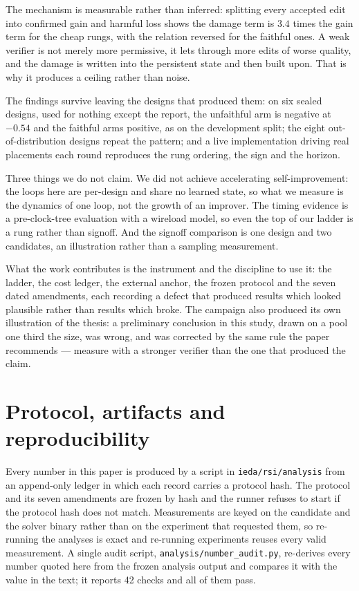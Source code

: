 \documentclass{article}
\begin{document}
The mechanism is measurable rather than inferred: splitting every accepted edit into
confirmed gain and harmful loss shows the damage term is $3.4$ times the gain term for
the cheap rungs, with the relation reversed for the faithful ones. A weak verifier is not
merely more permissive, it lets through more edits of worse quality, and the damage is
written into the persistent state and then built upon. That is why it produces a ceiling
rather than noise.

The findings survive leaving the designs that produced them: on six sealed designs, used
for nothing except the report, the unfaithful arm is negative at $-0.54$ and the faithful
arms positive, as on the development split; the eight out-of-distribution designs repeat
the pattern; and a live implementation driving real placements each round reproduces the
rung ordering, the sign and the horizon.

Three things we do not claim. We did not achieve accelerating self-improvement: the
loops here are per-design and share no learned state, so what we measure is the dynamics
of one loop, not the growth of an improver. The timing evidence is a pre-clock-tree
evaluation with a wireload model, so even the top of our ladder is a rung rather than
signoff. And the signoff comparison is one design and two candidates, an illustration
rather than a sampling measurement.

What the work contributes is the instrument and the discipline to use it: the ladder,
the cost ledger, the external anchor, the frozen protocol and the seven dated
amendments, each recording a defect that produced results which looked plausible rather
than results which broke. The campaign also produced its own illustration of the thesis:
a preliminary conclusion in this study, drawn on a pool one third the size, was wrong,
and was corrected by the same rule the paper recommends --- measure with a stronger
verifier than the one that produced the claim.

\appendix
\section{Protocol, artifacts and reproducibility}

Every number in this paper is produced by a script in \texttt{ieda/rsi/analysis} from
an append-only ledger in which each record carries a protocol hash. The protocol and its
seven amendments are frozen by hash and the runner refuses to start if the protocol hash
does not match. Measurements are keyed on the candidate and the solver binary rather than
on the experiment that requested them, so re-running the analyses is exact and re-running
experiments reuses every valid measurement. A single audit script,
\texttt{analysis/number\_audit.py}, re-derives every number quoted here from the frozen
analysis output and compares it with the value in the text; it reports 42 checks and all
of them pass.
\end{document}
